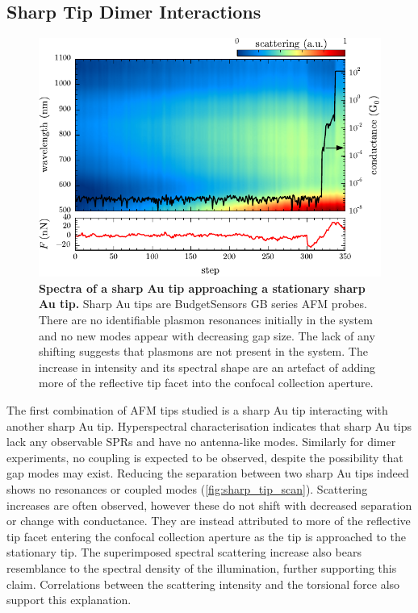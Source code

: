 \documentclass[a4paper]{article}
\begin{document}
\subsection{Sharp Tip Dimer Interactions}

\begin{figure}[bt]
\centering
\includegraphics{figures/sharp_au_tip_dimer_scan}
\caption[Spectra of a sharp Au tip approaching a stationary sharp Au tip]{\textbf{Spectra of a sharp Au tip approaching a stationary sharp Au tip.} Sharp Au tips are BudgetSensors GB series AFM probes. There are no identifiable plasmon resonances initially in the system and no new modes appear with decreasing gap size. The lack of any shifting suggests that plasmons are not present in the system. The increase in intensity and its spectral shape are an artefact of adding more of the reflective tip facet into the confocal collection aperture.}
\label{fig:sharp_tip_scan}
\end{figure}

The first combination of AFM tips studied is a sharp Au tip interacting with another sharp Au tip. Hyperspectral characterisation indicates that sharp Au tips lack any observable SPRs and have no antenna-like modes. Similarly for dimer experiments, no coupling is expected to be observed, despite the possibility that gap modes may exist. Reducing the separation between two sharp Au tips indeed shows no resonances or coupled modes (\autoref{fig:sharp_tip_scan}). Scattering increases are often observed, however these do not shift with decreased separation or change with conductance. They are instead attributed to more of the reflective tip facet entering the confocal collection aperture as the tip is approached to the stationary tip. The superimposed spectral scattering increase also bears resemblance to the spectral density of the illumination, further supporting this claim. Correlations between the scattering intensity and the torsional force also support this explanation.
\end{document}
